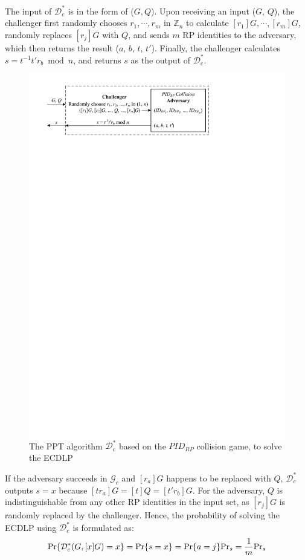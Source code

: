 The input of $\mathcal{D}^*_c$ is in the form of ($G, Q$).
Upon receiving an input ($G$, $Q$), the challenger first randomly chooses $r_1, \cdots, r_m$ in $\mathbb{Z}_n$ to calculate $[r_1]G, \cdots, [r_m]G$, randomly replaces $[r_j]G$ with $Q$, and sends $m$ RP identities to the adversary, which then returns the result ($a$, $b$, $t$, $t'$).
Finally, the challenger calculates $s = t^{-1}t'r_b \bmod n$, and returns $s$ as the output of $\mathcal{D}^*_c$.

\begin{figure}[tb]
  \centering
  \includegraphics[width=0.97\linewidth]{fig/ecdlp_algorithm.pdf}
  \caption{The PPT algorithm $\mathcal{D}^*_c$ based on the $PID_{RP}$ collision game, to solve the ECDLP}
  \label{fig:ecdlp_algorithm}
\end{figure}

If the adversary succeeds in $\mathcal{G}_c$ and $[r_a]G$ happens to be replaced with $Q$,
 $\mathcal{D}^*_c$ outputs $s=x$ because $[tr_a]G = [t]Q = [t'r_b]G$. For the adversary, $Q$ is indistinguishable from any other RP identities in the input set, as $[r_j]G$ is randomly replaced by the challenger.
Hence, the probability of solving the ECDLP using $\mathcal{D}^*_c$ is formulated as:
\begin{equation*}
{\rm Pr}\{\mathcal{D}^*_c(G, [x]G)=x\} = {\rm Pr}\{s = x\}={\rm Pr}\{a=j\}{\rm Pr}_s=\frac{1}{m}{\rm Pr}_s
\end{equation*}

